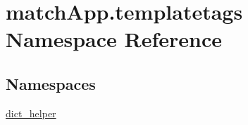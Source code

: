 \hypertarget{namespacematch_app_1_1templatetags}{}\section{match\+App.\+templatetags Namespace Reference}
\label{namespacematch_app_1_1templatetags}
\subsection*{Namespaces}
\begin{DoxyCompactItemize}
\item 
 \hyperlink{namespacematch_app_1_1templatetags_1_1dict__helper}{dict\+\_\+helper}
\end{DoxyCompactItemize}
